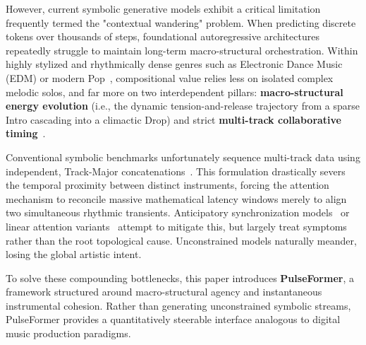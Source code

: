 \documentclass[conference]{IEEEtran}
\begin{document}
However, current symbolic generative models exhibit a critical limitation frequently termed the "contextual wandering" problem. When predicting discrete tokens over thousands of steps, foundational autoregressive architectures~\cite{vaswani2017attention, dai2019transformer} repeatedly struggle to maintain long-term macro-structural orchestration. Within highly stylized and rhythmically dense genres such as Electronic Dance Music (EDM) or modern Pop~\cite{snoman2013dance, senior2011mixing}, compositional value relies less on isolated complex melodic solos, and far more on two interdependent pillars: \textbf{macro-structural energy evolution} (i.e., the dynamic tension-and-release trajectory from a sparse Intro cascading into a climactic Drop) and strict \textbf{multi-track collaborative timing}~\cite{danielsen2006presence}. 

Conventional symbolic benchmarks unfortunately sequence multi-track data using independent, Track-Major concatenations~\cite{ens2020mmm, donahue2019lakhnes, liu2022symphony}. This formulation drastically severs the temporal proximity between distinct instruments, forcing the attention mechanism to reconcile massive mathematical latency windows merely to align two simultaneous rhythmic transients. Anticipatory synchronization models~\cite{thickstun2023anticipatory} or linear attention variants~\cite{katharopoulos2020transformers} attempt to mitigate this, but largely treat symptoms rather than the root topological cause. Unconstrained models naturally meander, losing the global artistic intent.

To solve these compounding bottlenecks, this paper introduces \textbf{PulseFormer}, a framework structured around macro-structural agency and instantaneous instrumental cohesion. Rather than generating unconstrained symbolic streams, PulseFormer provides a quantitatively steerable interface analogous to digital music production paradigms. 
\end{document}
